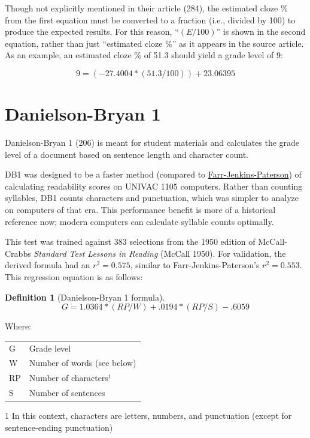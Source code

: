 \documentclass[
]{book}
\theoremstyle{definition}
\newtheorem{definition}{Definition}[chapter]
\theoremstyle{definition}
\theoremstyle{definition}
\theoremstyle{definition}
\theoremstyle{remark}
\begin{document}
Though not explicitly mentioned in their article (284), the estimated cloze \% from the first equation must be converted to a fraction (i.e., divided by 100) to produce the expected results. For this reason, ``\((E/100)\)'' is shown in the second equation, rather than just ``estimated cloze \%'' as it appears in the source article. As an example, an estimated cloze \% of 51.3 should yield a grade level of 9:

\[
9 = (-27.4004*(51.3/100)) + 23.06395
\]

\newpage

\hypertarget{danielson-bryan-1}{%
\section{\texorpdfstring{Danielson-Bryan 1}{Danielson-Bryan 1}}\label{danielson-bryan-1}}

Danielson-Bryan 1 (206) is meant for student materials and calculates the grade level of a document based on sentence length and character count.

DB1 was designed to be a faster method (compared to \protect\hyperlink{farr-jenkins-paterson}{Farr-Jenkins-Paterson}) of calculating readability scores on UNIVAC 1105 computers. Rather than counting syllables, DB1 counts characters and punctuation, which was simpler to analyze on computers of that era. This performance benefit is more of a historical reference now; modern computers can calculate syllable counts optimally.

This test was trained against 383 selections from the 1950 edition of McCall-Crabbs \emph{Standard Test Lessons in Reading} (McCall 1950). For validation, the derived formula had an \(r^2 = 0.575\), similar to Farr-Jenkins-Paterson's \(r^2 = 0.553\). This regression equation is as follows:

\begin{definition}[Danielson-Bryan 1 formula]
\protect\hypertarget{def:db1}{}{\label{def:db1} {} }\[
G = 1.0364*(RP/W) + .0194*(RP/S) - .6059
\]
\end{definition}

Where:

\begin{table}
\centering
\begin{threeparttable}
\begin{tabular}[t]{l>{\raggedright\arraybackslash}p{10cm}}
\toprule
G & Grade level\\
W & Number of words (see below)\\
RP & Number of characters¹\\
S & Number of sentences\\
\bottomrule
\end{tabular}
\begin{tablenotes}
\item[1] In this context, characters are letters, numbers, and punctuation (except for sentence-ending punctuation)
\end{tablenotes}
\end{threeparttable}
\end{table}
\end{document}
